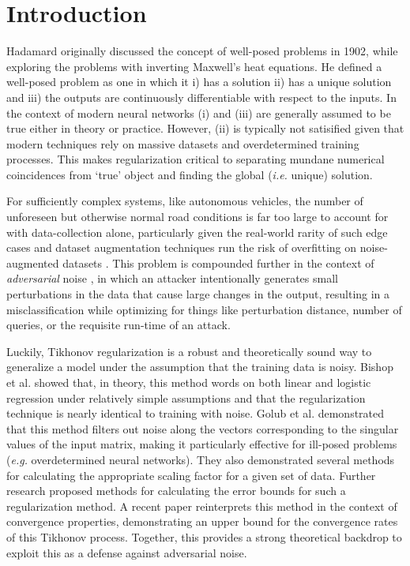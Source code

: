 \documentclass[conference]{IEEEtran}
\begin{document}
\section{Introduction}
Hadamard \cite{hadamard1902problemes} originally discussed the concept of well-posed problems in 1902, while exploring the problems with inverting Maxwell's heat equations. He defined a well-posed problem as one in which it i) has a solution ii) has a unique solution and iii) the outputs are continuously differentiable with respect to the inputs. In the context of modern neural networks (i) and (iii) are generally assumed to be true either in theory or practice. However, (ii) is typically not satisified given that modern techniques rely on massive datasets and overdetermined training processes. This makes regularization critical to separating mundane numerical coincidences from `true' object and finding the global  (\textit{i.e.} unique) solution.

For sufficiently complex systems, like autonomous vehicles, the number of unforeseen but otherwise normal road conditions is far too large to account for with data-collection alone, particularly given the real-world rarity of such edge cases and dataset augmentation techniques run the risk of overfitting on noise-augmented datasets \cite{koopman2016challenges}. This problem is compounded further in the context of \textit{adversarial} noise \cite{adversarialpatch, madry2017towards, chakraborty2018adversarial, biggio_evasion_2013, biggio_poisoning_2013, croce_reliable_2020, dohmatob_generalized_2019, fredrikson_model_2015, hopskipjump, kotyan2022adversarial}, in which an attacker intentionally generates small perturbations in the data that cause large changes in the output, resulting in a misclassification while optimizing for things like perturbation distance, number of queries, or the requisite run-time of an attack. 

Luckily, Tikhonov regularization is a robust and theoretically sound way to generalize a model under the assumption that the training data is noisy. Bishop et al. \cite{bishop1995training} showed that, in theory, this method words on both linear and logistic regression under relatively simple assumptions and that the regularization technique is nearly identical to training with noise. Golub et al. \cite{golub1999tikhonov} demonstrated that this method filters out noise along the vectors corresponding to the singular values of the input matrix, making it particularly effective for ill-posed problems (\textit{e.g.} overdetermined neural networks). They also demonstrated several methods for calculating the appropriate scaling factor for a given set of data. Further research \cite{zhao2011modified} proposed methods for calculating the error bounds for such a regularization method. A recent paper \cite{gerth2021new} reinterprets this method in the context of convergence properties, demonstrating an upper bound for the convergence rates of this Tikhonov process. Together, this provides a strong theoretical backdrop to exploit this as a defense against adversarial noise. 
\end{document}
